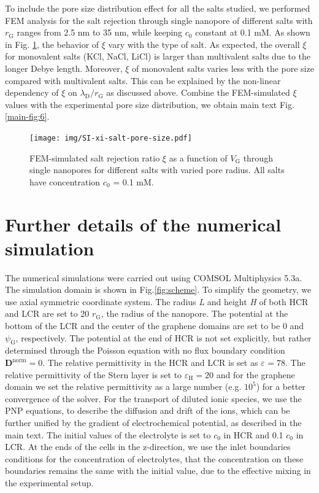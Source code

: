 \documentclass[manuscript=suppinfo,email=true, hyperref=true, keywords=false]{achemso}
\newcommand{\Fig}{Fig.}
\begin{document}
To include the pore size distribution effect for all the salts
studied, we performed FEM analysis for the salt rejection through
single nanopore of different salts with $r_{\mathrm{G}}$ ranges from
2.5 nm to 35 nm, while keeping $c_{0}$ constant at 0.1 mM. As shown in
\Fig{} \ref{fig:xi-salts-pore}, the behavior of $\xi$ vary with the
type of salt. As expected, the overall $\xi$ for monovalent salts
(KCl, NaCl, LiCl) is larger than multivalent salts due to the longer
Debye length. Moreover, $\xi$ of monovalent salts varies less with the
pore size compared with multivalent salts. This can be explained by
the non-linear dependency of $\xi$ on
$\lambda_{\mathrm{D}} / r_{\mathrm{G}}$ as discussed above. Combine
the FEM-simulated $\xi$ values with the experimental pore size
distribution, we obtain main text \Fig{} \ref{main-fig:6}.

\begin{figure}[htbp]
  \centering
   \texttt{[image: img/SI-xi-salt-pore-size.pdf]}
  \caption{FEM-simulated salt rejection ratio $\xi$ as a function of
    $V_{\mathrm{G}}$ through single nanopores for different salts with
    varied pore radius. All salts have concentration $c_{0}$ = 0.1 mM.}
  \label{fig:xi-salts-pore}
\end{figure}


\pagebreak
\section{Further details of the numerical simulation }
\label{sec:numer}

The numerical simulations were carried out using COMSOL Multiphysics
5.3a. The simulation domain is shown in \Fig \ref{fig:scheme}. To
simplify the geometry, we use axial symmetric coordinate system. The
radius \textit{L} and height \textit{H} of both HCR and LCR are set to
20 $r_{\mathrm{G}}$, the radius of the nanopore. The potential at the
bottom of the LCR and the center of the graphene domains are set to be
0 and $\psi_{\mathrm{G}}$, respectively. The potential at the end of
HCR is not set explicitly, but rather determined through the Poisson
equation with no flux boundary condition
$\boldsymbol{D}^{\mathrm{norm}}=0$. The relative permittivity in the
HCR and LCR is set as $\varepsilon_{\mathrm{}}=78$. The relative
permittivity of the Stern layer is set to
$\varepsilon_{\mathrm{H}}=20$\cite{Conway_1951} and for the graphene
domain we set the relative permittivity as a large number
(e.g. $10^{5}$) for a better convergence of the solver.  For the
transport of diluted ionic species, we use the PNP equations, to
describe the diffusion and drift of the ions, which can be further
unified by the gradient of electrochemical potential, as described in
the main text. The initial values of the electrolyte is set to $c_{0}$
in HCR and 0.1 $c_{0}$ in LCR. At the ends of the cells in the
z-direction, we use the inlet boundaries conditions for the
concentration of electrolytes, that the concentration on these
boundaries remains the same with the initial value, due to the
effective mixing in the experimental setup.
\end{document}
